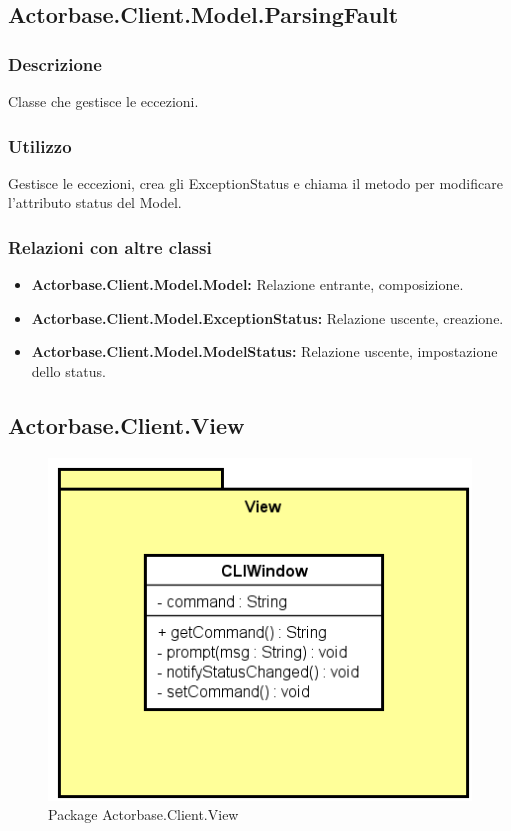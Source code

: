 \documentclass[a4paper]{article}
\begin{document}
		\subsection{Actorbase.Client.Model.ParsingFault}
			\subsubsection{Descrizione}
				Classe che gestisce le eccezioni.
			\subsubsection{Utilizzo}
				Gestisce le eccezioni, crea gli ExceptionStatus e chiama il metodo per modificare l'attributo status del Model.
			\subsubsection{Relazioni con altre classi}
				\begin{itemize}
					\item \textbf{Actorbase.Client.Model.Model:} Relazione entrante, composizione.
					\item \textbf{Actorbase.Client.Model.ExceptionStatus:} Relazione uscente, creazione.
					\item \textbf{Actorbase.Client.Model.ModelStatus:} Relazione uscente, impostazione dello status.
				\end{itemize}
		
		\subsection{Actorbase.Client.View}
			\begin{figure} [H]
				\centering
				\includegraphics[scale=0.6]{ST/Client/ViewClasses.png}
   		     	\caption{Package Actorbase.Client.View}
			\end{figure}
			
\end{document}
